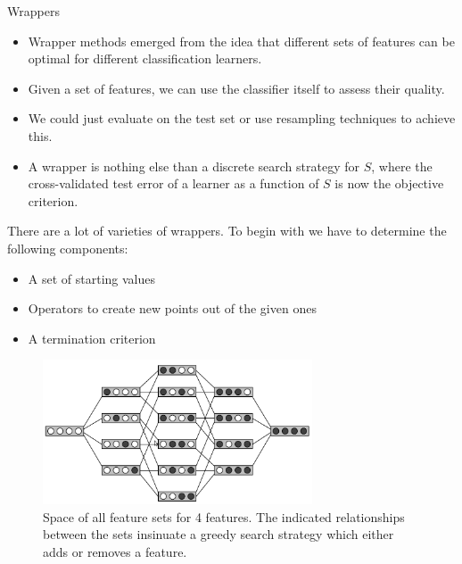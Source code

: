 









\begin{vbframe}{Wrappers}

\begin{itemize}
  \item Wrapper methods emerged from the idea that different sets of features can be optimal for different classification learners.
  \item Given a set of features, we can use the classifier itself to assess their quality.
  \item We could just evaluate on the test set or use resampling techniques to achieve this.
  \item A wrapper is nothing else than a discrete search strategy for $S$, where the cross-validated test error of a learner as a function of $S$ is now the objective criterion.

\end{itemize}


\framebreak

There are a lot of varieties of wrappers. To begin with we have to determine the following components:

\lz

\begin{itemize}
  \item A set of starting values
  \item Operators to create new points out of the given ones
  \item A termination criterion
\end{itemize}

\framebreak

\begin{figure}
  \includegraphics[width=8cm]{figure_man/varsel_space.png}
  \caption{Space of all feature sets for 4 features.
  The indicated relationships between the sets insinuate a greedy search strategy which either adds or removes a feature.}
\end{figure}


\end{vbframe}
